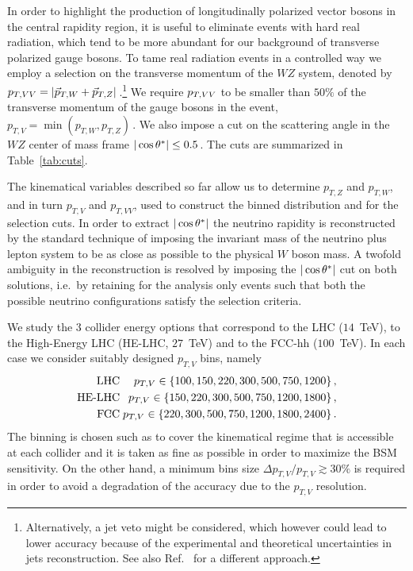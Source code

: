In order to highlight the production of longitudinally polarized vector bosons in the central rapidity region, it is useful to eliminate events with hard real radiation, which tend to be more abundant for our background of transverse polarized gauge bosons. To tame real radiation events in a controlled way we employ a selection on the transverse momentum of the $WZ$ system, denoted by $p_{T,VV}=|{\vec{p}}_{T,W}+{\vec{p}}_{T,Z}|\,$.\footnote{Alternatively, a jet veto might be considered, which however could lead to lower accuracy because of the experimental and theoretical uncertainties in jets reconstruction.
See also Ref.~\cite{Campanario:2014lza} for a different approach.} We require $p_{T,VV}$ to be smaller than $50\%$ of the transverse momentum of the gauge bosons in the event, $p_{T,V} = \min(p_{T,W}, p_{T,Z})\,$. We also impose a cut on the scattering angle in the $WZ$ center of mass frame
$|\cos \theta^{*}| \leq  0.5\,$. The cuts are summarized in Table~\ref{tab:cuts}.



The kinematical variables described so far allow us to determine $p_{T,Z}$ and $p_{T,W}$, and in turn $p_{T,V}$ and $p_{T,VV}$, used to construct the binned distribution and for the selection cuts. In order to extract $|\cos \theta^{*}|$ the neutrino rapidity is reconstructed by the standard technique of imposing the invariant mass of the neutrino plus lepton system to be as close as possible to the physical $W$ boson mass.
A twofold ambiguity in the reconstruction is resolved by imposing the $|\cos \theta^{*}|$ cut on both solutions, i.e.~by retaining for the analysis only events such that both the possible neutrino configurations satisfy the selection criteria.

We study the $3$ collider energy options that correspond to the LHC ($14$~TeV), to the High-Energy LHC (HE-LHC, $27$~TeV) and to the FCC-hh ($100$~TeV). In each case we consider suitably designed $p_{T,V}$ bins, namely 
\begin{eqnarray}\label{finalbins}
{\textrm{LHC\hspace{-10pt}}}&{\textrm{:}}& p_{T,V}\in\{100,150,220,300,500,750,1200 \}\,,\\
{\textrm{HE-LHC\hspace{-10pt}}}&{\textrm{:}}& p_{T,V}\in\{150,220,300,500,750,1200, 1800 \}\,,\nonumber\\
{\textrm{FCC\hspace{-10pt}}}&{\textrm{:}}& p_{T,V}\in\{220,300,500,750,1200, 1800, 2400 \}\,.\nonumber
\end{eqnarray}
The binning is chosen such as to cover the kinematical regime that is accessible at each collider and it is taken as fine as possible in order to maximize the BSM sensitivity. On the other hand, a minimum bins size $\Delta p_{T,V}/ p_{T,V}\gtrsim30\%$ is required in order to avoid a degradation of the accuracy due to the $p_{T,V}$ resolution.




